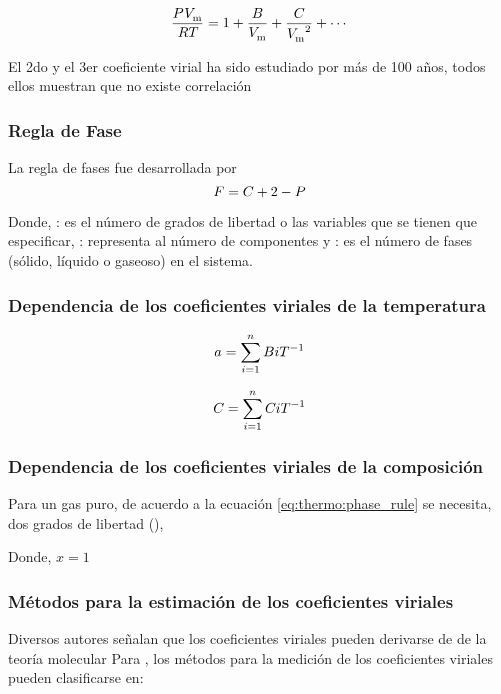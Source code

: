     \begin{equation}
      \eqVirialForVDevelop{}
    \end{equation}
    \namingEqVirialForVDevelop
    
    El 2do y el 3er coeficiente virial ha sido estudiado por más de 100 años, todos ellos muestran que no existe correlación \parencite{thirdVirialTing}



\subsubsection*{Regla de Fase}  
    La regla de fases fue desarrollada por 
    \begin{equation}
    \label{eq:thermo:phase_rule}
       F = C + 2 - P
    \end{equation}

    Donde,\newline 
    \freeDegree : es el número de grados de libertad o las variables que se tienen que especificar, \newline 
    \componentNumber : representa al número de componentes y \newline
    \phaseNumber : es el número de fases (sólido, líquido o gaseoso) en el sistema.

\subsubsection*{Dependencia de los coeficientes viriales de la temperatura}
    \begin{equation}
      a = \sum_{i=1}^{n} B_{}{i} T_{}^{-1}{}
    \end{equation}
    
    \begin{equation}
      C_{}{} = \sum_{i=1}^{n} C_{}{i} T_{}^{-1}{}
    \end{equation}

\subsubsection*{Dependencia de los coeficientes viriales de la composición}
    Para un gas puro, de acuerdo a la ecuación \eqref{eq:thermo:phase_rule} se necesita, dos grados de libertad (\freeDegree),  

    Donde, $x = 1$ 

\subsubsection{Métodos para la estimación de los coeficientes viriales}
    Diversos autores señalan que los coeficientes viriales pueden derivarse de \parencite[p. 4.13]{Poling2001} de la teoría molecular
    Para \parencite{Trusler10.1039/9781782627043-00152}, los métodos para la medición de los coeficientes viriales pueden clasificarse en:

